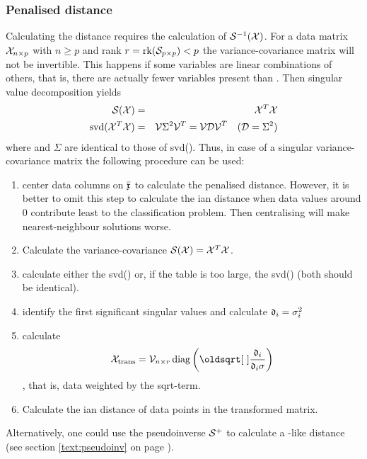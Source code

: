 \begin{refsection}
\subsubsection{Penalised  distance}

Calculating the  distance requires the calculation of \(\mathcal{S}^{-1}(\mathcal{X}) \).  For a data matrix \(\mathcal{X}_{n\times p} \) with \(n \geq p \) and rank \(r = \mathrm{rk}(\mathcal{S}_{p\times p}) < p \) the variance-covariance matrix will not be invertible. This happens if some variables are linear combinations of others, that is, there are actually fewer variables present than . Then singular value decomposition yields
\begin{eqnarray}
  \mathcal{S}(\mathcal{X}) &=& \mathcal{X}^T\mathcal{X} \\
  \operatorname{svd}(\mathcal{X}^T\mathcal{X})  &=& \mathcal{V} \Sigma^2 \mathcal{V}^T = \mathcal{VDV}^T \quad (\mathcal{D} = \Sigma^2)
\end{eqnarray}
where  and \(\Sigma \) are identical to those of svd(). Thus, in case of a singular variance-covariance matrix  the following procedure can be used:
\begin{enumerate}
  \item{center data columns on \(\bar{\mathfrak{x}} \) to calculate the penalised  distance. However, it is better to omit this step to calculate the ian distance when data values around 0 contribute least to the classification problem. Then centralising will make nearest-neighbour solutions worse.}
  \item{Calculate the variance-covariance \(\mathcal{S}(\mathcal{X}) = \mathcal{X}^T\mathcal{X} \).}
  \item{calculate either the svd() or, if the table is too large, the svd() (both should be identical).}
  \item{identify the first  significant singular values and calculate \(\mathfrak{d}_i = \sigma_i^2 \)}
  \item{calculate \[\arr{X}_\mathrm{trans} = \arr{V}_{n\times r} \diag{\left(\sqrt{\frac{\AbsVec{d}_i}{\AbsVec{d}_i \sigma}}\right)}\], that is, data weighted by the sqrt-term. }
  \item{Calculate the ian distance of data points in the transformed matrix.}
\end{enumerate}
Alternatively, one could use the  pseudoinverse \(\mathcal{S}^+ \) to calculate a -like distance (see section \ref{text:pseudoinv} on page \pageref{text:pseudoinv}).


\end{refsection}
